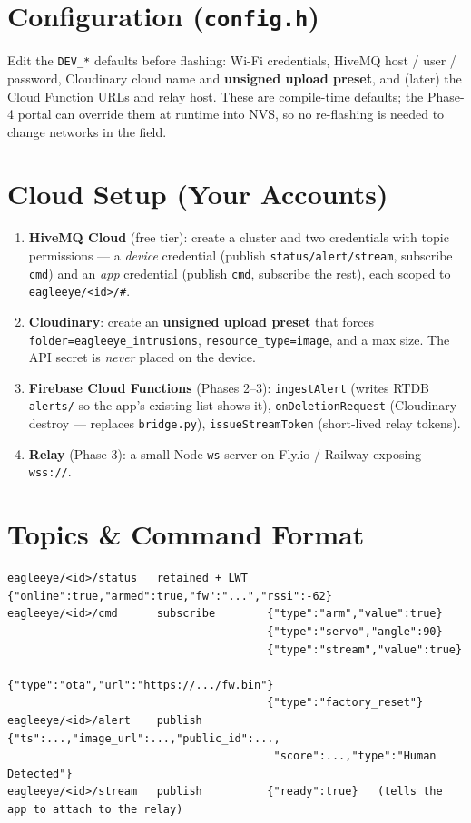 \documentclass[11pt,a4paper]{article}
\newcommand{\code}[1]{\texttt{#1}}
\begin{document}
\section{Configuration (\texttt{config.h})}
Edit the \code{DEV\_*} defaults before flashing: Wi-Fi credentials, HiveMQ host / user /
password, Cloudinary cloud name and \textbf{unsigned upload preset}, and (later) the Cloud
Function URLs and relay host. These are compile-time defaults; the Phase-4 portal can override
them at runtime into NVS, so no re-flashing is needed to change networks in the field.

\section{Cloud Setup (Your Accounts)}
\begin{enumerate}[leftmargin=1.5em]
  \item \textbf{HiveMQ Cloud} (free tier): create a cluster and two credentials with topic
        permissions --- a \emph{device} credential (publish \code{status/alert/stream},
        subscribe \code{cmd}) and an \emph{app} credential (publish \code{cmd}, subscribe the rest),
        each scoped to \code{eagleeye/<id>/\#}.
  \item \textbf{Cloudinary}: create an \textbf{unsigned upload preset} that forces
        \code{folder=eagleeye\_intrusions}, \code{resource\_type=image}, and a max size.
        The API secret is \emph{never} placed on the device.
  \item \textbf{Firebase Cloud Functions} (Phases 2--3): \code{ingestAlert} (writes RTDB
        \code{alerts/} so the app's existing list shows it), \code{onDeletionRequest}
        (Cloudinary destroy --- replaces \code{bridge.py}), \code{issueStreamToken}
        (short-lived relay tokens).
  \item \textbf{Relay} (Phase 3): a small Node \code{ws} server on Fly.io / Railway exposing \code{wss://}.
\end{enumerate}

\section{Topics \& Command Format}
\begin{lstlisting}
eagleeye/<id>/status   retained + LWT   {"online":true,"armed":true,"fw":"...","rssi":-62}
eagleeye/<id>/cmd      subscribe        {"type":"arm","value":true}
                                        {"type":"servo","angle":90}
                                        {"type":"stream","value":true}
                                        {"type":"ota","url":"https://.../fw.bin"}
                                        {"type":"factory_reset"}
eagleeye/<id>/alert    publish          {"ts":...,"image_url":...,"public_id":...,
                                         "score":...,"type":"Human Detected"}
eagleeye/<id>/stream   publish          {"ready":true}   (tells the app to attach to the relay)
\end{lstlisting}
\end{document}
